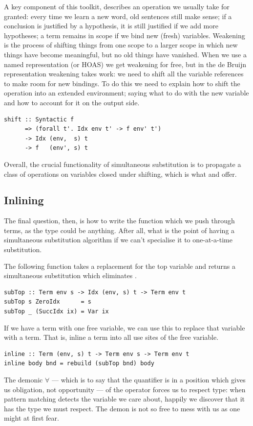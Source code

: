 A key component of this toolkit,  describes an operation we
usually take for granted: every time we learn a new word, old sentences still
make sense; if a conclusion is justified by a hypothesis, it is still justified
if we add more hypotheses; a term remains in scope if we bind new (fresh)
variables. Weakening is the process of shifting things from one scope to a
larger scope in which new things have become meaningful, but no old things have
vanished. When we use a named representation (or HOAS) we get weakening
for free, but in the de Bruijn representation weakening takes
work: we need to shift all the variable references to make room for new
bindings. To do this we need to explain how to shift the  operation into
an extended environment; saying what to do with the new variable and how to
account for it on the output side.
%
\begin{lstlisting}[style=haskell]
shift :: Syntactic f
      => (forall t'. Idx env t' -> f env' t')
      -> Idx (env,  s) t
      -> f   (env', s) t
\end{lstlisting}
%
Overall, the crucial functionality of simultaneous substitution is to propagate
a class of operations on variables closed under shifting, which is what
 and  offer.


\subsection{Inlining}
\label{sec:inlining}

The final question, then, is how to write the function  which we push
through terms, as the type  could be anything. After all, what
is the point of having a simultaneous substitution algorithm if we can't
specialise it to one-at-a-time substitution.

The following function takes a replacement for the top variable and returns a
simultaneous substitution which eliminates .
%
\begin{lstlisting}[style=haskell
    ,name=inlining
    ,caption={[A simultaneous substitution to inline terms]}]
subTop :: Term env s -> Idx (env, s) t -> Term env t
subTop s ZeroIdx      = s
subTop _ (SuccIdx ix) = Var ix
\end{lstlisting}
%
If we have a term with one free variable, we can use this to replace that
variable with a term. That is, inline a term into all use sites of the free
variable.
%
\begin{lstlisting}[style=haskell,
    name=inlining,
    caption={A simultaneous substitution to inline terms}]
inline :: Term (env, s) t -> Term env s -> Term env t
inline body bnd = rebuild (subTop bnd) body
\end{lstlisting}
%
The demonic $\forall$ --- which is to say that the quantifier is in a position
which gives us obligation, not opportunity --- of the operator  forces
us to respect type: when pattern matching detects the variable we care about,
happily we discover that it has the type we must respect. The demon is not so
free to mess with us as one might at first fear.

